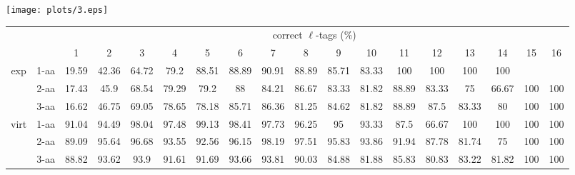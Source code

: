 \documentclass{article}
\begin{document}
\texttt{[image: plots/3.eps]}\begin{table}[h]\tiny
\vspace{3mm}
{\centering
\begin{center}
\begin{tabular}{|c|l|c|c|c|c|c|c|c|c|c|c|c|c|c|c|c|c|}
  \hline
  \multicolumn{2}{|c|}{ } & \multicolumn{ 16 }{|c|}{ correct $\ell$-tags (\%)} \\
  \cline{3- 18}
  \multicolumn{2}{|c|}{ }  & 1 & 2 & 3 & 4 & 5 & 6 & 7 & 8 & 9 & 10 & 11 & 12 & 13 & 14 & 15 & 16\\
  \hline
  \multirow{3}{*}{exp}
&  1-aa  & 19.59 & 42.36 & 64.72 & 79.2 & 88.51 & 88.89 & 90.91 & 88.89 & 85.71 & 83.33 & 100 & 100 & 100 & 100 &  & \\&  2-aa  & 17.43 & 45.9 & 68.54 & 79.29 & 79.2 & 88 & 84.21 & 86.67 & 83.33 & 81.82 & 88.89 & 83.33 & 75 & 66.67 & 100 & 100\\&  3-aa  & 16.62 & 46.75 & 69.05 & 78.65 & 78.18 & 85.71 & 86.36 & 81.25 & 84.62 & 81.82 & 88.89 & 87.5 & 83.33 & 80 & 100 & 100\\ \hline
  \multirow{3}{*}{virt} 
&  1-aa  & 91.04 & 94.49 & 98.04 & 97.48 & 99.13 & 98.41 & 97.73 & 96.25 & 95 & 93.33 & 87.5 & 66.67 & 100 & 100 & 100 & 100\\&  2-aa  & 89.09 & 95.64 & 96.68 & 93.55 & 92.56 & 96.15 & 98.19 & 97.51 & 95.83 & 93.86 & 91.94 & 87.78 & 81.74 & 75 & 100 & 100\\&  3-aa  & 88.82 & 93.62 & 93.9 & 91.61 & 91.69 & 93.66 & 93.81 & 90.03 & 84.88 & 81.88 & 85.83 & 80.83 & 83.22 & 81.82 & 100 & 100\\ \hline
\end{tabular}
\end{center}
\par}
\centering
\vspace{3mm}
\label{table:table3}
\end{table}
\end{document}
